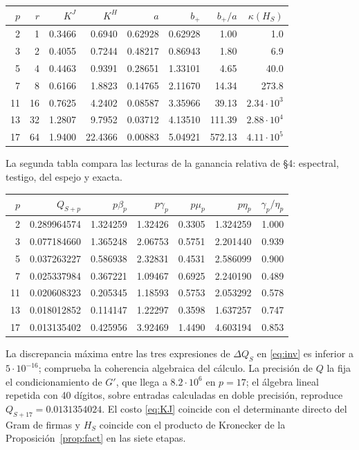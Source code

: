 \documentclass[11pt,a4paper]{article}
\theoremstyle{plain}
\begin{document}
\begin{center}
\small
\begin{tabular}{rrrrrrrr}
\toprule
$p$ & $r$ & $K^J$ & $K^H$ & $a$ & $b_+$ & $b_+/a$ & $\kappa(H_S)$\\
\midrule
2 & 1 & 0.3466 & 0.6940 & 0.62928 & 0.62928 & 1.00 & 1.0\\
3 & 2 & 0.4055 & 0.7244 & 0.48217 & 0.86943 & 1.80 & 6.9\\
5 & 4 & 0.4463 & 0.9391 & 0.28651 & 1.33101 & 4.65 & 40.0\\
7 & 8 & 0.6166 & 1.8823 & 0.14765 & 2.11670 & 14.34 & 273.8\\
11 & 16 & 0.7625 & 4.2402 & 0.08587 & 3.35966 & 39.13 & $2.34\cdot10^{3}$\\
13 & 32 & 1.2807 & 9.7952 & 0.03712 & 4.13510 & 111.39 & $2.88\cdot10^{4}$\\
17 & 64 & 1.9400 & 22.4366 & 0.00883 & 5.04921 & 572.13 & $4.11\cdot10^{5}$\\
\bottomrule
\end{tabular}
\end{center}

La segunda tabla compara las lecturas de la ganancia relativa de \S4: espectral, testigo, del espejo y exacta.

\begin{center}
\small
\begin{tabular}{rrrrrrr}
\toprule
$p$ & $Q_{S+p}$ & $p\beta_p$ & $p\gamma_p$ & $p\mu_p$ & $p\eta_p$ & $\gamma_p/\eta_p$\\
\midrule
2 & 0.289964574 & 1.324259 & 1.32426 & 0.3305 & 1.324259 & 1.000\\
3 & 0.077184660 & 1.365248 & 2.06753 & 0.5751 & 2.201440 & 0.939\\
5 & 0.037263227 & 0.586938 & 2.32831 & 0.4531 & 2.586099 & 0.900\\
7 & 0.025337984 & 0.367221 & 1.09467 & 0.6925 & 2.240190 & 0.489\\
11 & 0.020608323 & 0.205345 & 1.18593 & 0.5753 & 2.053292 & 0.578\\
13 & 0.018012852 & 0.114147 & 1.22297 & 0.3598 & 1.637257 & 0.747\\
17 & 0.013135402 & 0.425956 & 3.92469 & 1.4490 & 4.603194 & 0.853\\
\bottomrule
\end{tabular}
\end{center}

La discrepancia máxima entre las tres expresiones de $\Delta Q_S$ en \eqref{eq:inv} es inferior a $5\cdot10^{-16}$; comprueba la coherencia algebraica del cálculo. La precisión de $Q$ la fija el condicionamiento de $G'$, que llega a $8.2\cdot10^{6}$ en $p=17$; el álgebra lineal repetida con 40 dígitos, sobre entradas calculadas en doble precisión, reproduce $Q_{S+17}=0.0131354024$. El costo \eqref{eq:KJ} coincide con el determinante directo del Gram de firmas y $H_S$ coincide con el producto de Kronecker de la Proposición~\ref{prop:fact} en las siete etapas.
\end{document}

